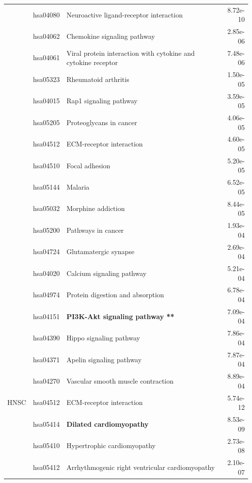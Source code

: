 \begin{longtable}{cllr}
 & hsa04080 & \textcolor{\clrnew}{Neuroactive ligand-receptor interaction} & 8.72e-10 \\ 
 & hsa04062 & \textcolor{\clrnew}{Chemokine signaling pathway} & 2.85e-06 \\ 
 & hsa04061 & \textcolor{\clrnew}{Viral protein interaction with cytokine and cytokine receptor} & 7.48e-06 \\ 
 & hsa05323 & \textcolor{\clrnew}{Rheumatoid arthritis} & 1.50e-05 \\ 
 & hsa04015 & \textcolor{\clrnew}{Rap1 signaling pathway} & 3.59e-05 \\ 
 & hsa05205 & \textcolor{\clrnew}{Proteoglycans in cancer} & 4.06e-05 \\ 
 & hsa04512 & \textcolor{\clrnew}{ECM-receptor interaction} & 4.60e-05 \\ 
 & hsa04510 & \textcolor{\clrnew}{Focal adhesion} & 5.20e-05 \\ 
 & hsa05144 & \textcolor{\clrnew}{Malaria} & 6.52e-05 \\ 
 & hsa05032 & \textcolor{\clrnew}{Morphine addiction} & 8.44e-05 \\ 
 & hsa05200 & \textcolor{\clrnew}{Pathways in cancer} & 1.93e-04 \\ 
 & hsa04724 & \textcolor{\clrnew}{Glutamatergic synapse} & 2.69e-04 \\ 
 & hsa04020 & \textcolor{\clrnew}{Calcium signaling pathway} & 5.21e-04 \\ 
 & hsa04974 & \textcolor{\clrnew}{Protein digestion and absorption} & 6.78e-04 \\ 
 \rowcolor{\clrpath}& hsa04151 & \textbf{PI3K-Akt signaling pathway **} & 7.09e-04 \\ 
 & hsa04390 & \textcolor{\clrnew}{Hippo signaling pathway} & 7.86e-04 \\ 
 & hsa04371 & \textcolor{\clrnew}{Apelin signaling pathway} & 7.87e-04 \\ 
 & hsa04270 & \textcolor{\clrnew}{Vascular smooth muscle contraction} & 8.89e-04 \\ 
\midrule 
\rowcolor{\clrmatch}HNSC & hsa04512 & ECM-receptor interaction & 5.74e-12\\ 
 \rowcolor{\clrpath}& hsa05414 & \textbf{Dilated cardiomyopathy} & 8.53e-09 \\ 
 \rowcolor{\clrmatch}& hsa05410 & Hypertrophic cardiomyopathy & 2.73e-08 \\ 
 \rowcolor{\clrmatch}& hsa05412 & Arrhythmogenic right ventricular cardiomyopathy & 2.10e-07 \\ 

\end{longtable}
